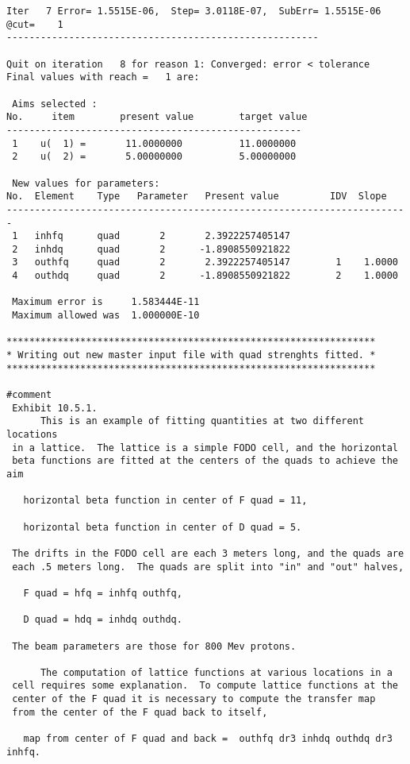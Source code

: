 \begin{footnotesize}
\begin{verbatim}
Iter   7 Error= 1.5515E-06,  Step= 3.0118E-07,  SubErr= 1.5515E-06 @cut=    1
-------------------------------------------------------

Quit on iteration   8 for reason 1: Converged: error < tolerance
Final values with reach =   1 are:

 Aims selected :
No.     item        present value        target value
----------------------------------------------------
 1    u(  1) =       11.0000000          11.0000000
 2    u(  2) =       5.00000000          5.00000000

 New values for parameters:
No.  Element    Type   Parameter   Present value         IDV  Slope
-----------------------------------------------------------------------
 1   inhfq      quad       2       2.3922257405147
 2   inhdq      quad       2      -1.8908550921822
 3   outhfq     quad       2       2.3922257405147        1    1.0000
 4   outhdq     quad       2      -1.8908550921822        2    1.0000

 Maximum error is     1.583444E-11
 Maximum allowed was  1.000000E-10

*****************************************************************
* Writing out new master input file with quad strenghts fitted. *
*****************************************************************

#comment
 Exhibit 10.5.1.
      This is an example of fitting quantities at two different locations
 in a lattice.  The lattice is a simple FODO cell, and the horizontal
 beta functions are fitted at the centers of the quads to achieve the aim

   horizontal beta function in center of F quad = 11,

   horizontal beta function in center of D quad = 5.

 The drifts in the FODO cell are each 3 meters long, and the quads are
 each .5 meters long.  The quads are split into "in" and "out" halves,

   F quad = hfq = inhfq outhfq,

   D quad = hdq = inhdq outhdq.

 The beam parameters are those for 800 Mev protons.

      The computation of lattice functions at various locations in a
 cell requires some explanation.  To compute lattice functions at the
 center of the F quad it is necessary to compute the transfer map
 from the center of the F quad back to itself,

   map from center of F quad and back =  outhfq dr3 inhdq outhdq dr3 inhfq.


\end{verbatim}
\end{footnotesize}
